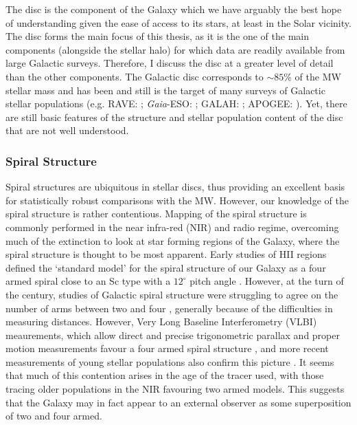 The disc is the component of the Galaxy which we have arguably the best hope of understanding given the ease of access to its stars, at least in the Solar vicinity. The disc forms the main focus of this thesis, as it is the one of the main components (alongside the stellar halo) for which data are readily available from large Galactic surveys. Therefore, I discuss the disc at a greater level of detail than the other components. The Galactic disc corresponds to $\sim85\%$ of the MW stellar mass \citep[e.g.][]{2013A&ARv..21...61R} and has been and still is the target of many surveys of Galactic stellar populations (e.g. RAVE: \citeauthor{2006AJ....132.1645S} \citeyear{2006AJ....132.1645S}; \emph{Gaia}-ESO: \citeauthor{2012Msngr.147...25G} \citeyear{2012Msngr.147...25G}; GALAH: \citeauthor{2016arXiv160902822M} \citeyear{2016arXiv160902822M}; APOGEE: \citeauthor{2015arXiv150905420M} \citeyear{2015arXiv150905420M}).  Yet, there are still basic features of the structure and stellar population content of the disc that are not well understood.

\subsubsection{Spiral Structure}
Spiral structures are ubiquitous in stellar discs, thus providing an excellent basis for statistically robust comparisons with the MW. However, our knowledge of the spiral structure is rather contentious. Mapping of the spiral structure is commonly performed in the near infra-red (NIR) and radio regime, overcoming much of the extinction to look at star forming regions of the Galaxy, where the spiral structure is thought to be most apparent. Early studies of HII regions defined the `standard model' for the spiral structure of our Galaxy as a four armed spiral close to an Sc type with a $12^{\circ}$ pitch angle  \citep{1976A&A....49...57G}. However, at the turn of the century, studies of Galactic spiral structure were struggling to agree on the number of arms between two and four \citep[e.g.][]{1976A&A....46..261S,1980ApJ...239L..53C,1981ApJ...250..551B,1995ApJ...454..119V,2000A&A...358L..13D,2003A&A...397..133R}, generally because of the difficulties in measuring distances. However, Very Long Baseline Interferometry (VLBI) meaurements, which allow direct and precise trigonometric parallax and proper motion measurements favour a four armed spiral structure \citep{2009ApJ...700..137R,2014ApJ...783..130R}, and more recent measurements of young stellar populations also confirm this picture \citep{2014MNRAS.437.1791U,2015MNRAS.450.4150C}. It seems that much of this contention arises in the age of the tracer used, with those tracing older populations in the NIR \citep[e.g.][]{2000A&A...358L..13D} favouring two armed models. This suggests that the Galaxy may in fact appear to an external observer as some superposition of two and four armed. 

